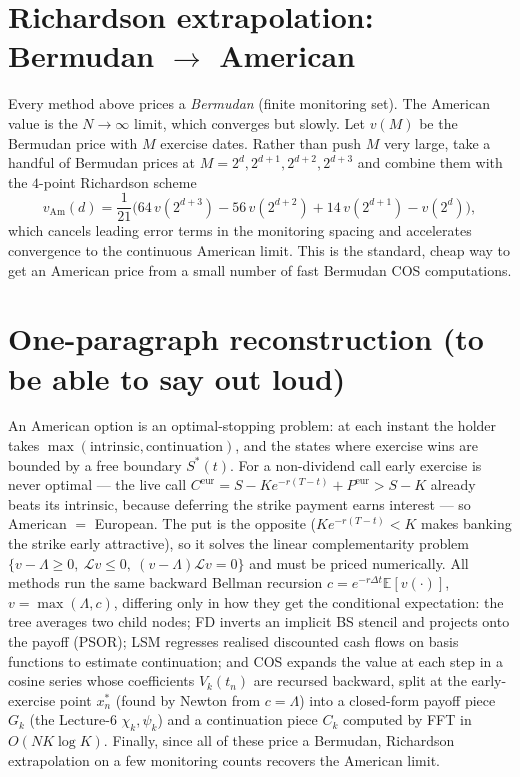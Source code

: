 \documentclass[11pt]{article}
\newcommand{\E}{\mathbb{E}}
\begin{document}
\section{Richardson extrapolation: Bermudan $\to$ American}\label{sec:rich}

Every method above prices a \emph{Bermudan} (finite monitoring set). The American value is the
$N\to\infty$ limit, which converges but slowly. Let $v(M)$ be the Bermudan price with $M$ exercise dates.
Rather than push $M$ very large, take a handful of Bermudan prices at $M=2^d,2^{d+1},2^{d+2},2^{d+3}$ and
combine them with the $4$-point Richardson scheme
\begin{equation}\label{eq:richardson}
v_{\mathrm{Am}}(d)=\frac{1}{21}\Big(64\,v(2^{d+3})-56\,v(2^{d+2})+14\,v(2^{d+1})-v(2^{d})\Big),
\end{equation}
which cancels leading error terms in the monitoring spacing and accelerates convergence to the continuous
American limit. This is the standard, cheap way to get an American price from a small number of fast Bermudan
COS computations.

\section{One-paragraph reconstruction (to be able to say out loud)}

An American option is an optimal-stopping problem: at each instant the holder takes $\max(\text{intrinsic},
\text{continuation})$, and the states where exercise wins are bounded by a free boundary $S^\ast(t)$. For a
non-dividend call early exercise is never optimal --- the live call $C^{\text{eur}}=S-Ke^{-r(T-t)}+P^{\text{eur}}
>S-K$ already beats its intrinsic, because deferring the strike payment earns interest --- so American
$=$ European. The put is the opposite ($Ke^{-r(T-t)}<K$ makes banking the strike early attractive), so it
solves the linear complementarity problem $\{v-\Lambda\ge0,\ \mathcal L v\le0,\ (v-\Lambda)\mathcal L v=0\}$ and
must be priced numerically. All methods run the same backward Bellman recursion $c=e^{-r\Delta t}\E[v(\cdot)]$,
$v=\max(\Lambda,c)$, differing only in how they get the conditional expectation: the tree averages two child
nodes; FD inverts an implicit BS stencil and projects onto the payoff (PSOR); LSM regresses realised discounted
cash flows on basis functions to estimate continuation; and COS expands the value at each step in a cosine
series whose coefficients $V_k(t_n)$ are recursed backward, split at the early-exercise point $x_n^\ast$
(found by Newton from $c=\Lambda$) into a closed-form payoff piece $G_k$ (the Lecture-6 $\chi_k,\psi_k$) and a
continuation piece $C_k$ computed by FFT in $O(NK\log K)$. Finally, since all of these price a Bermudan,
Richardson extrapolation on a few monitoring counts recovers the American limit.
\end{document}
